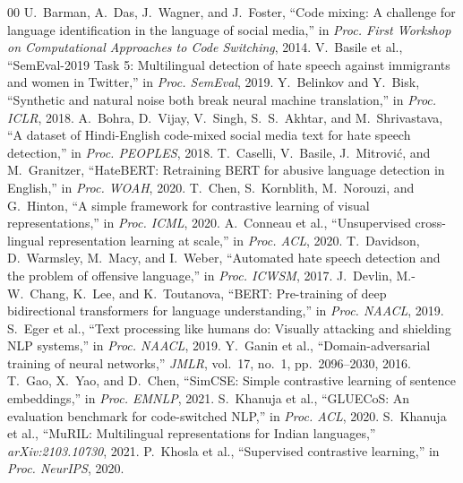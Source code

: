 \documentclass[conference]{IEEEtran}
\begin{document}
\begin{thebibliography}{00}
 U.~Barman, A.~Das, J.~Wagner, and J.~Foster, ``Code mixing: A challenge for language identification in the language of social media,'' in \textit{Proc. First Workshop on Computational Approaches to Code Switching}, 2014.
 V.~Basile et al., ``SemEval-2019 Task 5: Multilingual detection of hate speech against immigrants and women in Twitter,'' in \textit{Proc. SemEval}, 2019.
 Y.~Belinkov and Y.~Bisk, ``Synthetic and natural noise both break neural machine translation,'' in \textit{Proc. ICLR}, 2018.
 A.~Bohra, D.~Vijay, V.~Singh, S.~S.~Akhtar, and M.~Shrivastava, ``A dataset of Hindi-English code-mixed social media text for hate speech detection,'' in \textit{Proc. PEOPLES}, 2018.
 T.~Caselli, V.~Basile, J.~Mitrovi{\'c}, and M.~Granitzer, ``HateBERT: Retraining BERT for abusive language detection in English,'' in \textit{Proc. WOAH}, 2020.
 T.~Chen, S.~Kornblith, M.~Norouzi, and G.~Hinton, ``A simple framework for contrastive learning of visual representations,'' in \textit{Proc. ICML}, 2020.
 A.~Conneau et al., ``Unsupervised cross-lingual representation learning at scale,'' in \textit{Proc. ACL}, 2020.
 T.~Davidson, D.~Warmsley, M.~Macy, and I.~Weber, ``Automated hate speech detection and the problem of offensive language,'' in \textit{Proc. ICWSM}, 2017.
 J.~Devlin, M.-W.~Chang, K.~Lee, and K.~Toutanova, ``BERT: Pre-training of deep bidirectional transformers for language understanding,'' in \textit{Proc. NAACL}, 2019.
 S.~Eger et al., ``Text processing like humans do: Visually attacking and shielding NLP systems,'' in \textit{Proc. NAACL}, 2019.
 Y.~Ganin et al., ``Domain-adversarial training of neural networks,'' \textit{JMLR}, vol.~17, no.~1, pp.~2096--2030, 2016.
 T.~Gao, X.~Yao, and D.~Chen, ``SimCSE: Simple contrastive learning of sentence embeddings,'' in \textit{Proc. EMNLP}, 2021.
 S.~Khanuja et al., ``GLUECoS: An evaluation benchmark for code-switched NLP,'' in \textit{Proc. ACL}, 2020.
 S.~Khanuja et al., ``MuRIL: Multilingual representations for Indian languages,'' \textit{arXiv:2103.10730}, 2021.
 P.~Khosla et al., ``Supervised contrastive learning,'' in \textit{Proc. NeurIPS}, 2020.

\end{thebibliography}
\end{document}
